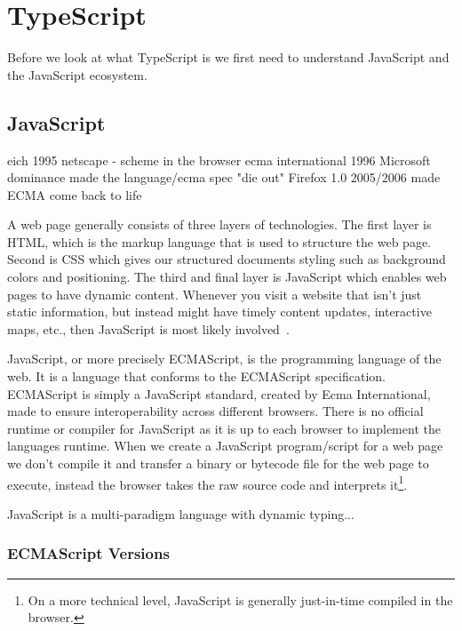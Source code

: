 
\section{TypeScript}\label{sec:typescript}

Before we look at what TypeScript is we first need to understand JavaScript and the JavaScript ecosystem.

\subsection{JavaScript}\label{subsec:javascript}


eich 1995 netscape - scheme in the browser
ecma international 1996
Microsoft dominance made the language/ecma spec "die out"
Firefox 1.0 2005/2006 made ECMA come back to life

A web page generally consists of three layers of technologies.
The first layer is HTML, which is the markup language that is used to structure the web page.
Second is CSS which gives our structured documents styling such as background colors and positioning.
The third and final layer is JavaScript which enables web pages to have dynamic content.
Whenever you visit a website that isn't just static information, but instead might have timely content updates, interactive maps, etc., then JavaScript is most likely involved~\cite{whatisjs}.

JavaScript, or more precisely ECMAScript, is the programming language of the web.
It is a language that conforms to the ECMAScript specification.
ECMAScript is simply a JavaScript standard, created by Ecma International, made to ensure interoperability across different browsers.
There is no official runtime or compiler for JavaScript as it is up to each browser to implement the languages runtime.
When we create a JavaScript program/script for a web page we don't compile it and transfer a binary or bytecode file for the web page to execute, instead the browser takes the raw source code and interprets it\footnote{On a more technical level, JavaScript is generally just-in-time compiled in the browser.}.

JavaScript is a multi-paradigm language with dynamic typing...

\subsubsection{ECMAScript Versions}\label{subsubsec:ecmascript-versions}

